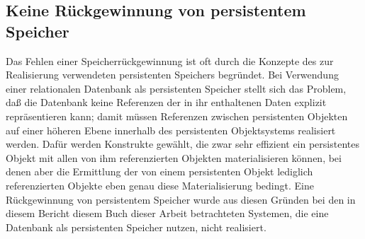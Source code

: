 \subsection{Keine R\"{u}ckgewinnung von persistentem Speicher}
%
Das Fehlen einer Speicherr\"{u}ckgewinnung ist oft durch die Konzepte des
zur Realisierung verwendeten persistenten Speichers begr\"{u}ndet. Bei
Verwendung einer relationalen Datenbank als persistenten Speicher
stellt sich das Problem, da\ss{} die Datenbank keine Referenzen der in
ihr enthaltenen Daten explizit re\-pr\"{a}\-sen\-tie\-ren kann; damit
m\"{u}ssen Referenzen zwischen persistenten Objekten auf einer h\"{o}heren
Ebene innerhalb des persistenten Objektsystems realisiert
werden. Daf\"{u}r werden Konstrukte gew\"{a}hlt, die zwar sehr effizient ein
persistentes Objekt mit allen von ihm referenzierten Objekten
materialisieren k\"{o}nnen, bei denen aber die Ermittlung der von einem
persistenten Objekt lediglich referenzierten Objekte eben genau diese
Materialisierung bedingt.
%
Eine R\"{u}ckgewinnung von persistentem Speicher wurde aus diesen
Gr\"{u}nden bei den in \ifbericht diesem Bericht \else\ifbuch diesem
Buch \else dieser Arbeit \fi\fi betrachteten Systemen, die eine
Datenbank als persistenten Speicher nutzen, nicht realisiert.
%
%
